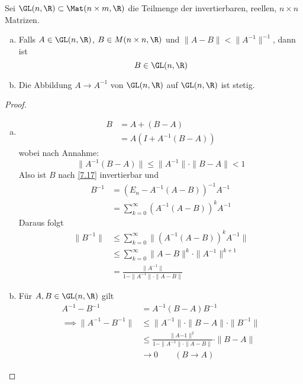 \documentclass{mycourse}
\begin{document}
\begin{st}
\label{14.2}
Sei $\GL(n,\R)\subset \Mat(n\times m,\R)$ die Teilmenge der invertierbaren, reellen, $n\times n$ Matrizen.
\begin{enumerate}[a)]
\item Falls $A\in \GL(n,\R)$, $B\in M(n\times n,\R)$ und $\|A-B\|<\|A^{-1}\|^{-1}$, dann ist
\[
	B\in \GL(n,\R)
\]
\item Die Abbildung $A\to A^{-1}$ von $\GL(n,\R)$ auf $\GL(n,\R)$ ist stetig.
\end{enumerate}
\begin{proof}
\begin{enumerate}[a)]
\item
\begin{align*}
B &= A+(B-A)\\
&= A(I + A^{-1}(B-A))
\end{align*}
wobei nach Annahme:
\[
\|A^{-1}(B-A)\| \le \|A^{-1}\|\cdot \|B-A\|<1
\]
Also ist $B$ nach \ref{7.17} invertierbar und
\begin{align*}
B^{-1}&= (E_n-A^{-1}(A-B))^{-1}A^{-1}\\
&=\sum_{k=0}^\infty (A^{-1}(A-B))^k A^{-1}
\end{align*}
Daraus folgt
\begin{align*}
\|B^{-1}\| &\le \sum_{k=0}^\infty \| (A^{-1}(A-B))^{k}A^{-1}\|\\
&\le \sum_{k=0}^\infty \|A-B\|^k\cdot \|A^{-1}\|^{k+1}\\
&= \frac {\|A^{-1}\|}{1-\|A^{-1}\|\cdot \|A-B\|}
\end{align*}

\item
Für $A,B\in \GL(n,\R)$ gilt
\begin{align*}
A^{-1}-B^{-1} &= A^{-1}(B-A)B^{-1}\\
\implies \|A^{-1}-B^{-1}\| &\le\|A^{-1}\|\cdot\|B-A\|\cdot \|B^{-1}\|\\
&\le \frac{\|A{-1}\|^2}{1-\|A^{-1}\|\cdot\|A-B\|}\cdot \|B-A\|\\
&\to 0 \qquad (B\to A)
\end{align*}
\end{enumerate}
\end{proof}
\end{st}
\end{document}
